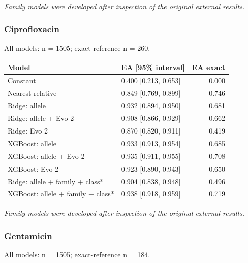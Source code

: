 \documentclass[
  10pt,
]{article}
\newcounter{none} %
\begin{document}
\emph{Family models were developed after inspection of the original
external results.}

\subsubsection{Ciprofloxacin}\label{ciprofloxacin}

All models: n = 1505; exact-reference n = 260.

{\def\LTcaptype{none} %
\begin{longtable}[]{@{}llr@{}}
\toprule\noalign{}
Model & EA {[}95\% interval{]} & EA exact \\
\midrule\noalign{}
\endhead
\bottomrule\noalign{}
\endlastfoot
Constant & 0.400 {[}0.213, 0.653{]} & 0.000 \\
Nearest relative & 0.849 {[}0.769, 0.899{]} & 0.746 \\
Ridge: allele & 0.932 {[}0.894, 0.950{]} & 0.681 \\
Ridge: allele + Evo 2 & 0.908 {[}0.866, 0.929{]} & 0.662 \\
Ridge: Evo 2 & 0.870 {[}0.820, 0.911{]} & 0.419 \\
XGBoost: allele & 0.933 {[}0.913, 0.954{]} & 0.685 \\
XGBoost: allele + Evo 2 & 0.935 {[}0.911, 0.955{]} & 0.708 \\
XGBoost: Evo 2 & 0.923 {[}0.890, 0.943{]} & 0.650 \\
Ridge: allele + family + class* & 0.904 {[}0.838, 0.948{]} & 0.496 \\
XGBoost: allele + family + class* & 0.938 {[}0.918, 0.959{]} & 0.719 \\
\end{longtable}
}

\emph{Family models were developed after inspection of the original
external results.}

\subsubsection{Gentamicin}\label{gentamicin}

All models: n = 1505; exact-reference n = 184.
\end{document}

